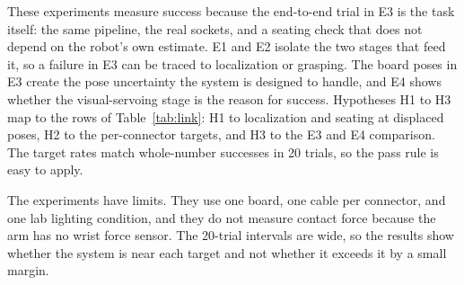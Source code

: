 \documentclass[11pt,conference]{IEEEtran}
\begin{document}
These experiments measure success because the end-to-end trial in E3 is the task itself: the same pipeline, the real sockets, and a seating check that does not depend on the robot's own estimate. E1 and E2 isolate the two stages that feed it, so a failure in E3 can be traced to localization or grasping. The board poses in E3 create the pose uncertainty the system is designed to handle, and E4 shows whether the visual-servoing stage is the reason for success. Hypotheses H1 to H3 map to the rows of Table~\ref{tab:link}: H1 to localization and seating at displaced poses, H2 to the per-connector targets, and H3 to the E3 and E4 comparison. The target rates match whole-number successes in 20 trials, so the pass rule is easy to apply.

The experiments have limits. They use one board, one cable per connector, and one lab lighting condition, and they do not measure contact force because the arm has no wrist force sensor. The 20-trial intervals are wide, so the results show whether the system is near each target and not whether it exceeds it by a small margin.




\end{document}
